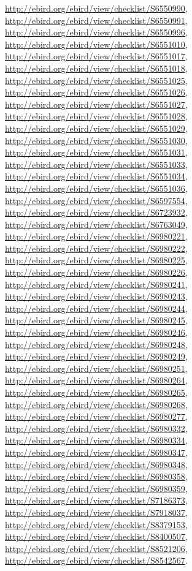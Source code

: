 \documentclass[9pt, article]{memoir}
\begin{document}
\begin{multicols}{2}
\url{http://ebird.org/ebird/view/checklist/S6550990}, 
\url{http://ebird.org/ebird/view/checklist/S6550991}, 
\url{http://ebird.org/ebird/view/checklist/S6550996}, 
\url{http://ebird.org/ebird/view/checklist/S6551010}, 
\url{http://ebird.org/ebird/view/checklist/S6551017}, 
\url{http://ebird.org/ebird/view/checklist/S6551018}, 
\url{http://ebird.org/ebird/view/checklist/S6551025}, 
\url{http://ebird.org/ebird/view/checklist/S6551026}, 
\url{http://ebird.org/ebird/view/checklist/S6551027}, 
\url{http://ebird.org/ebird/view/checklist/S6551028}, 
\url{http://ebird.org/ebird/view/checklist/S6551029}, 
\url{http://ebird.org/ebird/view/checklist/S6551030}, 
\url{http://ebird.org/ebird/view/checklist/S6551031}, 
\url{http://ebird.org/ebird/view/checklist/S6551033}, 
\url{http://ebird.org/ebird/view/checklist/S6551034}, 
\url{http://ebird.org/ebird/view/checklist/S6551036}, 
\url{http://ebird.org/ebird/view/checklist/S6597554}, 
\url{http://ebird.org/ebird/view/checklist/S6723932}, 
\url{http://ebird.org/ebird/view/checklist/S6763049}, 
\url{http://ebird.org/ebird/view/checklist/S6980221}, 
\url{http://ebird.org/ebird/view/checklist/S6980222}, 
\url{http://ebird.org/ebird/view/checklist/S6980225}, 
\url{http://ebird.org/ebird/view/checklist/S6980226}, 
\url{http://ebird.org/ebird/view/checklist/S6980241}, 
\url{http://ebird.org/ebird/view/checklist/S6980243}, 
\url{http://ebird.org/ebird/view/checklist/S6980244}, 
\url{http://ebird.org/ebird/view/checklist/S6980245}, 
\url{http://ebird.org/ebird/view/checklist/S6980246}, 
\url{http://ebird.org/ebird/view/checklist/S6980248}, 
\url{http://ebird.org/ebird/view/checklist/S6980249}, 
\url{http://ebird.org/ebird/view/checklist/S6980251}, 
\url{http://ebird.org/ebird/view/checklist/S6980264}, 
\url{http://ebird.org/ebird/view/checklist/S6980265}, 
\url{http://ebird.org/ebird/view/checklist/S6980268}, 
\url{http://ebird.org/ebird/view/checklist/S6980277}, 
\url{http://ebird.org/ebird/view/checklist/S6980332}, 
\url{http://ebird.org/ebird/view/checklist/S6980334}, 
\url{http://ebird.org/ebird/view/checklist/S6980347}, 
\url{http://ebird.org/ebird/view/checklist/S6980348}, 
\url{http://ebird.org/ebird/view/checklist/S6980358}, 
\url{http://ebird.org/ebird/view/checklist/S6980359}, 
\url{http://ebird.org/ebird/view/checklist/S7186373}, 
\url{http://ebird.org/ebird/view/checklist/S7918037}, 
\url{http://ebird.org/ebird/view/checklist/S8379153}, 
\url{http://ebird.org/ebird/view/checklist/S8400507}, 
\url{http://ebird.org/ebird/view/checklist/S8521206}, 
\url{http://ebird.org/ebird/view/checklist/S8542567}.


\end{multicols}
\end{document}
